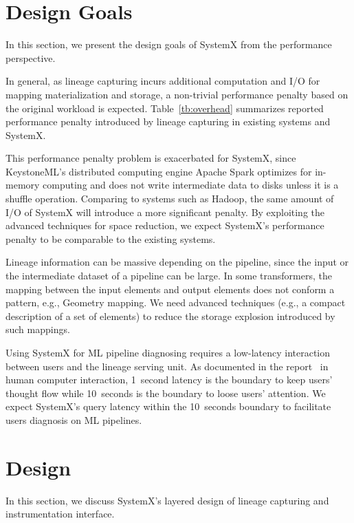 \documentclass{sig-alternate}
\begin{document}
\section{Design Goals}
\label{sec:Req}
In this section, we present the design goals of SystemX from the performance perspective.

In general, as lineage capturing incurs additional computation and I/O for mapping materialization and storage, a non-trivial performance
penalty based on the original workload is expected. 
Table~\ref{tb:overhead} summarizes reported performance penalty introduced by lineage capturing in existing systems and SystemX. 


This performance penalty problem is exacerbated for SystemX, since KeystoneML's distributed computing engine Apache Spark 
optimizes for in-memory computing and does not write intermediate data to disks unless it is a shuffle operation. 
Comparing to systems such as Hadoop, the same amount of I/O of SystemX will introduce a more significant penalty.
By exploiting the advanced techniques for space reduction, we expect SystemX's performance penalty to be comparable to the existing systems.

Lineage information can be massive depending on the pipeline, since the input or the intermediate dataset of a pipeline can be large.
In some transformers, the mapping between the input elements and output elements does not conform a pattern, e.g., Geometry mapping.
We need advanced techniques (e.g., a compact description of a set of elements) to reduce the storage explosion introduced by such mappings. 

Using SystemX for ML pipeline diagnosing requires a low-latency interaction between users and the lineage serving unit.
As documented in the report~\cite{nielsen2009} in human computer interaction, 1~second latency is the boundary to keep users' thought flow while 10~seconds
is the boundary to loose users' attention.
We expect SystemX's query latency within the 10~seconds boundary to facilitate users diagnosis on ML pipelines.

\section{Design}
\label{sec:Design}
In this section, we discuss SystemX's layered design of lineage capturing and instrumentation interface.
\end{document}
